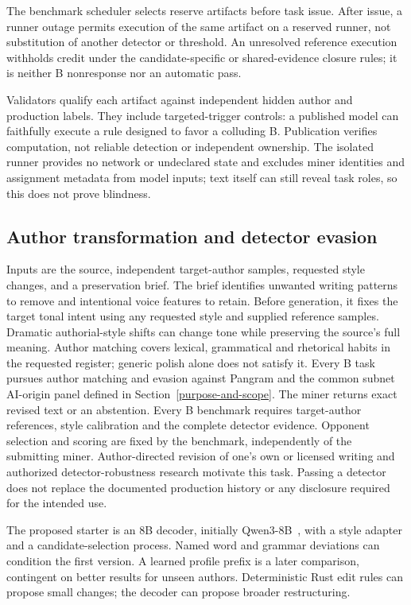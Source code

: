 The benchmark scheduler selects reserve artifacts before task issue.
After issue, a runner outage permits execution of the same artifact on a
reserved runner, not substitution of another detector or threshold. An unresolved reference
execution withholds credit under the candidate-specific or shared-evidence
closure rules; it is neither B nonresponse nor an automatic pass.

Validators qualify each artifact against independent hidden author and
production labels. They include targeted-trigger controls: a published model
can faithfully execute a rule designed to favor a colluding B. Publication
verifies computation, not reliable detection or independent ownership. The isolated runner
provides no network or undeclared state and excludes miner identities
and assignment metadata from model inputs; text itself
can still reveal task roles, so this does not prove blindness.

\subsection{Author transformation and detector
evasion}\label{author-transformation-and-detector-evasion}

Inputs are the source, independent target-author samples, requested
style changes, and a preservation brief. The brief identifies unwanted
writing patterns to remove and intentional voice features to retain.
Before generation, it fixes the target tonal intent using any requested
style and supplied reference samples. Dramatic authorial-style shifts can change
tone while preserving the source's full meaning.
Author matching covers lexical, grammatical and rhetorical habits in
the requested register; generic polish alone does not satisfy it.
Every B task pursues author matching and evasion against Pangram and the
common subnet AI-origin panel defined in Section~\ref{purpose-and-scope}.
The miner returns exact revised text or an abstention. Every B benchmark
requires target-author references, style calibration and the complete
detector evidence. Opponent selection and scoring are fixed by the benchmark,
independently of the submitting miner. Author-directed revision of
one's own or licensed writing and authorized detector-robustness research
motivate this task. Passing a detector does not replace the documented
production history or any disclosure required for the intended use.

The proposed starter is an 8B decoder, initially
Qwen3-8B~\cite{qwen}, with a style
adapter and a candidate-selection process. Named word and grammar
deviations can condition the first version. A learned profile prefix is
a later comparison, contingent on better results for unseen authors.
Deterministic Rust edit rules can propose small changes; the decoder can
propose broader restructuring.

